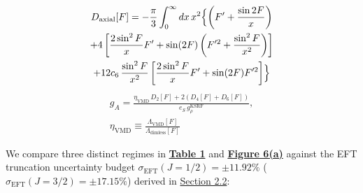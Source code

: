 \documentclass[10pt,aps,prd,twocolumn,superscriptaddress,nofootinbib,floatfix,longbibliography,showkeys]{revtex4-2}
\begin{document}
\begin{enumerate}
\begin{multline}
D_{\text{axial}}[F] = -\frac{\pi}{3}\int_0^\infty dx\,x^2\Bigl\{ \left(F' + \frac{\sin 2F}{x}\right) \\
+ 4\left[\frac{2\sin^2 F}{x}F' + \sin(2F)\left(F'^2 + \frac{\sin^2 F}{x^2}\right)\right] \\
+ 12 c_6\,\frac{\sin^2 F}{x^2}\left[\frac{2\sin^2 F}{x}F' + \sin(2F)F'^2\right] \Bigr\}
\end{multline}
\begin{equation}\begin{gathered}
g_A = \frac{\eta_{\text{VMD}}\,D_2[F] + 2\left(D_4[F] + D_6[F]\right)}{e_S\,g_\rho^{\text{KSRF}}}, \\
\eta_{\text{VMD}} \equiv \frac{\Lambda_{\text{VMD}}[F]}{\Lambda_{\text{dimless}}[F]}
\end{gathered}\end{equation}

\end{enumerate}
We compare three distinct regimes in \textbf{\hyperref[tab:table1]{Table 1}} and \textbf{\hyperref[fig:fig6]{Figure 6(a)}} against the EFT truncation uncertainty budget $\sigma_{\text{EFT}}(J=1/2) = \pm 11.92\%$ ($\sigma_{\text{EFT}}(J=3/2) = \pm 17.15\%$) derived in \hyperref[sec:2.2]{Section 2.2}:
\end{document}
